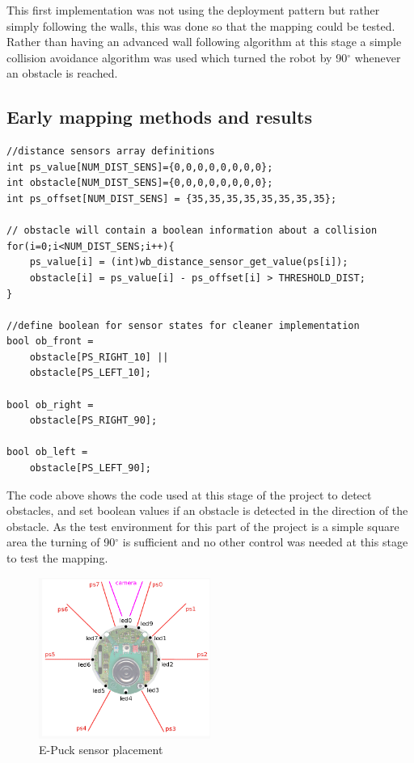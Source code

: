 This first implementation was not using the deployment pattern but rather simply following the walls, this was done so that the mapping could be tested. Rather than having an advanced wall following algorithm at this stage a simple collision avoidance algorithm was used which turned the robot by 90$^\circ$ whenever an obstacle is reached.

\subsection{Early mapping methods and results}

\begin{lstlisting}[caption={Proximity sensor reading}]
//distance sensors array definitions
int ps_value[NUM_DIST_SENS]={0,0,0,0,0,0,0,0};
int obstacle[NUM_DIST_SENS]={0,0,0,0,0,0,0,0};
int ps_offset[NUM_DIST_SENS] = {35,35,35,35,35,35,35,35};

// obstacle will contain a boolean information about a collision
for(i=0;i<NUM_DIST_SENS;i++){
    ps_value[i] = (int)wb_distance_sensor_get_value(ps[i]);
    obstacle[i] = ps_value[i] - ps_offset[i] > THRESHOLD_DIST;
}

//define boolean for sensor states for cleaner implementation
bool ob_front =
    obstacle[PS_RIGHT_10] ||
    obstacle[PS_LEFT_10];

bool ob_right =
    obstacle[PS_RIGHT_90];

bool ob_left =
    obstacle[PS_LEFT_90];
\end{lstlisting}

The code above shows the code used at this stage of the project to detect obstacles, and set boolean values if an obstacle is detected in the direction of the  obstacle. As the test environment for this part of the project is a simple square area the turning of 90$^{\circ}$ is sufficient and no other control was needed at this stage to test the mapping.

\begin{figure}[h]
\centering
\includegraphics[width = 0.5\textwidth]{../../figures/e_puck_sensor_placement.png}
\caption[E-Puck sensor placement]{E-Puck sensor placement\footnotemark}
\label{sensor_placement}
\end{figure}

